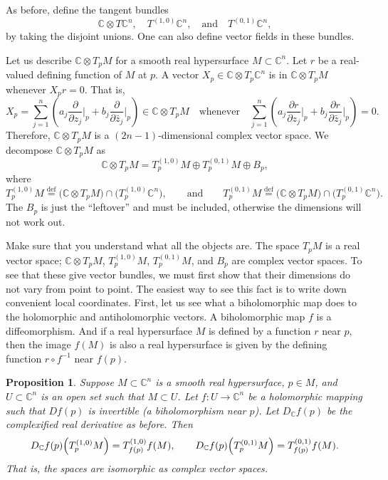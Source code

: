\documentclass[12pt,openany]{book}
\newcommand{\C}{{\mathbb{C}}}
\theoremstyle{plain}
\newtheorem{prop}[thm]{Proposition}
\theoremstyle{remark}
\theoremstyle{definition}
\theoremstyle{exercise}
\theoremstyle{example}
\begin{document}
As before, define the tangent bundles
\begin{equation*}
\C \otimes T\C^n,
\quad
T^{(1,0)} \C^n,
\quad \text{and} \quad
T^{(0,1)} \C^n ,
\end{equation*}
by taking the disjoint unions.
One can also define vector fields in these bundles.

Let us describe $\C \otimes T_pM$
for a smooth real hypersurface $M \subset \C^n$.
Let $r$ be a real-valued defining function of
$M$ at $p$.  A vector
$X_p \in \C \otimes T_p\C^n$ is in
$\C \otimes T_pM$ whenever $X_p r = 0$.  That is,
\begin{equation*}
X_p = \sum_{j=1}^n
\left(
a_j 
\frac{\partial}{\partial z_j} \Big|_p
+
b_j
\frac{\partial}{\partial \bar{z}_j} \Big|_p
\right) \in \C \otimes T_p M
\quad
\text{whenever}
\quad
 \sum_{j=1}^n
\left(
a_j 
\frac{\partial r}{\partial z_j} \Big|_p
+
b_j
\frac{\partial r}{\partial \bar{z}_j} \Big|_p
\right)
= 0 .
\end{equation*}
Therefore, $\C \otimes T_p M$ is a $(2n-1)$-dimensional complex vector space.
We decompose 
$\C \otimes T_p M$ as
\begin{equation*}
\C \otimes T_pM = 
T_p^{(1,0)} M \oplus T_p^{(0,1)} M \oplus B_p ,
\end{equation*}
where
\begin{equation*}
T_p^{(1,0)} M \overset{\text{def}}{=} \bigl( \C \otimes T_pM \bigr) \cap
\bigl( T_p^{(1,0)} \C^n \bigr),  \qquad \text{and}
\qquad
T_p^{(0,1)} M \overset{\text{def}}{=} \bigl( \C \otimes T_pM \bigr) \cap
\bigl( T_p^{(0,1)} \C^n \bigr) .
\end{equation*}
The $B_p$ is just the ``leftover'' and must
be included, otherwise the dimensions will not work out.

Make sure that you understand what all the objects are.  The space
$T_pM$ is a real vector space; $\C \otimes T_pM$, $T_p^{(1,0)}M$,
$T_p^{(0,1)} M$, and $B_p$ are complex vector spaces.  To see that
these give vector bundles,
we must first show that their dimensions do not vary
from point to point.  The easiest way to see this fact is to write down
convenient local coordinates.  First, let us see what a biholomorphic map
does to the holomorphic and antiholomorphic vectors.  A biholomorphic map
$f$ is a diffeomorphism.  And if a real hypersurface $M$ is defined
by a function $r$ near $p$, then the image $f(M)$ is also
a real hypersurface is given by the defining function
$r \circ f^{-1}$ near $f(p)$.


\begin{prop}
Suppose $M \subset \C^n$ is a smooth real hypersurface, $p \in M$,
and $U \subset \C^n$ is an open set such that $M \subset U$.
Let $f \colon U \to \C^n$ be a holomorphic mapping such
that $D f(p)$ is invertible (a biholomorphism near $p$).  Let $D_\C f(p)$ be
the complexified real derivative as before.  Then
\begin{equation*}
D_\C f(p)\Bigl(T_p^{(1,0)}M\Bigr) = T_{f(p)}^{(1,0)}f(M), \qquad
D_\C f(p)\Bigl(T_p^{(0,1)}M\Bigr) = T_{f(p)}^{(0,1)}f(M).
\end{equation*}
That is, the spaces are isomorphic as complex vector spaces.
\end{prop}
\end{document}

